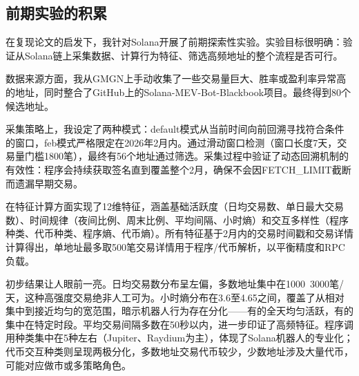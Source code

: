 \subsection{前期实验的积累}
\par 在复现论文的启发下，我针对Solana开展了前期探索性实验。实验目标很明确：验证从Solana链上采集数据、计算行为特征、筛选高频地址的整个流程是否可行。
\par 数据来源方面，我从GMGN上手动收集了一些交易量巨大、胜率或盈利率异常高的地址，同时整合了GitHub上的Solana-MEV-Bot-Blackbook项目。最终得到80个候选地址。
\par 采集策略上，我设定了两种模式：default模式从当前时间向前回溯寻找符合条件的窗口，feb模式严格限定在2026年2月内。通过滑动窗口检测（窗口长度7天，交易量门槛1800笔），最终有56个地址通过筛选。采集过程中验证了动态回溯机制的有效性：程序会持续获取签名直到覆盖整个2月，确保不会因FETCH\_LIMIT截断而遗漏早期交易。
\par 在特征计算方面实现了12维特征，涵盖基础活跃度（日均交易数、单日最大交易数）、时间规律（夜间比例、周末比例、平均间隔、小时熵）和交互多样性（程序种类、代币种类、程序熵、代币熵）。所有特征基于2月内的交易时间戳和交易详情计算得出，单地址最多取500笔交易详情用于程序/代币解析，以平衡精度和RPC负载。
\par 初步结果让人眼前一亮。日均交易数分布呈左偏，多数地址集中在1000~3000笔/天，这种高强度交易绝非人工可为。小时熵分布在3.6至4.65之间，覆盖了从相对集中到接近均匀的宽范围，暗示机器人行为存在分化——有的全天均匀活跃，有的集中在特定时段。平均交易间隔多数在50秒以内，进一步印证了高频特征。程序调用种类集中在5种左右（Jupiter、Raydium为主），体现了Solana机器人的专业化；代币交互种类则呈现两极分化，多数地址交易代币较少，少数地址涉及大量代币，可能对应做市或多策略角色。